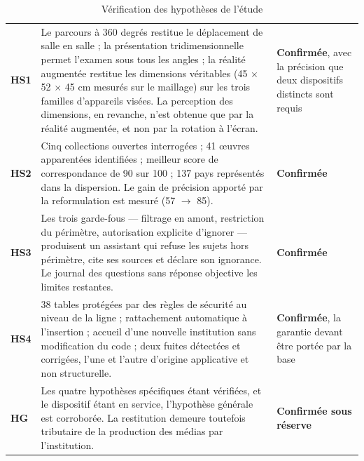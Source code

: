 \begin{table}[htbp]
\centering
\caption{Vérification des hypothèses de l'étude}
\label{tab:hypotheses}
\footnotesize
\begin{tabularx}{\textwidth}{|C{1.2cm}|X|C{2.6cm}|}
\hline
{}
 &  &  \\ \hline
\textbf{HS1} &
Le parcours à 360 degrés restitue le déplacement de salle en salle ; la
présentation tridimensionnelle permet l'examen sous tous les angles ; la réalité
augmentée restitue les dimensions véritables (45 $\times$ 52 $\times$ 45 cm
mesurés sur le maillage) sur les trois familles d'appareils visées. La
perception des dimensions, en revanche, n'est obtenue que par la réalité
augmentée, et non par la rotation à l'écran. &
\textbf{Confirmée}, avec la précision que deux dispositifs distincts sont
requis \\ \hline
\textbf{HS2} &
Cinq collections ouvertes interrogées ; 41 œuvres apparentées identifiées ;
meilleur score de correspondance de 90 sur 100 ; 137 pays représentés dans la
dispersion. Le gain de précision apporté par la reformulation est mesuré
(57 $\rightarrow$ 85). &
\textbf{Confirmée} \\ \hline
\textbf{HS3} &
Les trois garde-fous — filtrage en amont, restriction du périmètre, autorisation
explicite d'ignorer — produisent un assistant qui refuse les sujets hors
périmètre, cite ses sources et déclare son ignorance. Le journal des questions
sans réponse objective les limites restantes. &
\textbf{Confirmée} \\ \hline
\textbf{HS4} &
38 tables protégées par des règles de sécurité au niveau de la ligne ;
rattachement automatique à l'insertion ; accueil d'une nouvelle institution sans
modification du code ; deux fuites détectées et corrigées, l'une et l'autre
d'origine applicative et non structurelle. &
\textbf{Confirmée}, la garantie devant être portée par la base \\ \hline
\textbf{HG} &
Les quatre hypothèses spécifiques étant vérifiées, et le dispositif étant en
service, l'hypothèse générale est corroborée. La restitution demeure toutefois
tributaire de la production des médias par l'institution. &
\textbf{Confirmée sous réserve} \\ \hline
\end{tabularx}
\end{table}

